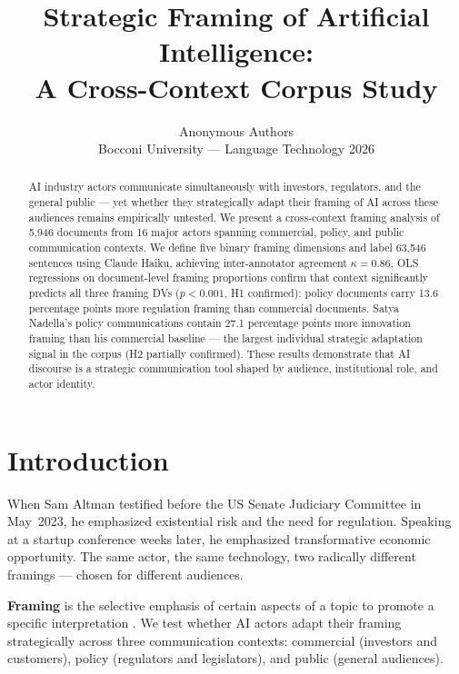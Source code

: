 \documentclass[11pt,a4paper,twocolumn]{article}
\title{\textbf{Strategic Framing of Artificial Intelligence:\\
               A Cross-Context Corpus Study}}
\author{Anonymous Authors\\
        Bocconi University — Language Technology 2026}
\date{}
\begin{document}
\maketitle

\begin{abstract}
AI industry actors communicate simultaneously with investors, regulators, and
the general public — yet whether they strategically adapt their framing of AI
across these audiences remains empirically untested. We present a cross-context
framing analysis of 5,946 documents from 16 major actors spanning commercial,
policy, and public communication contexts. We define five binary framing
dimensions and label 63,546 sentences using Claude Haiku, achieving
inter-annotator agreement $\kappa = 0.86$. OLS regressions on
document-level framing proportions confirm that context significantly predicts
all three framing DVs ($p < 0.001$, H1 confirmed): policy documents carry 13.6
percentage points more regulation framing than commercial documents. Satya
Nadella's policy communications contain 27.1 percentage points more innovation
framing than his commercial baseline — the largest individual strategic
adaptation signal in the corpus (H2 partially confirmed). These results
demonstrate that AI discourse is a strategic communication tool shaped by
audience, institutional role, and actor identity.
\end{abstract}

\section{Introduction}

When Sam Altman testified before the US Senate Judiciary Committee in May~2023,
he emphasized existential risk and the need for regulation. Speaking at a
startup conference weeks later, he emphasized transformative economic opportunity.
The same actor, the same technology, two radically different framings — chosen
for different audiences.

\textbf{Framing} is the selective emphasis of certain aspects of a topic to
promote a specific interpretation \citep{entman1993framing, goffman1974frame}.
We test whether AI actors adapt their framing strategically across three
communication contexts: commercial (investors and customers), policy (regulators
and legislators), and public (general audiences).
\end{document}
